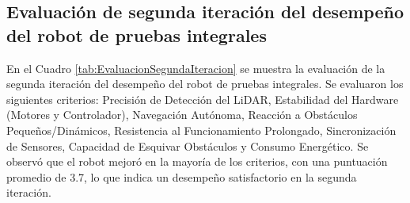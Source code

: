 \subsection{Evaluaci\'on de segunda iteraci\'on del desempe\~no del robot de pruebas integrales}
En el Cuadro \ref{tab:EvaluacionSegundaIteracion} se muestra la evaluaci\'on de la segunda iteraci\'on del desempe\~no del robot de pruebas integrales. Se evaluaron los siguientes criterios: Precisi\'on de Detecci\'on del LiDAR, Estabilidad del Hardware (Motores y Controlador), Navegaci\'on Aut\'onoma, Reacci\'on a Obst\'aculos Peque\~nos/Din\'amicos, Resistencia al Funcionamiento Prolongado, Sincronizaci\'on de Sensores, Capacidad de Esquivar Obst\'aculos y Consumo Energ\'etico. Se observ\'o que el robot mejor\'o en la mayor\'ia de los criterios, con una puntuaci\'on promedio de 3.7, lo que indica un desempe\~no satisfactorio en la segunda iteraci\'on.
